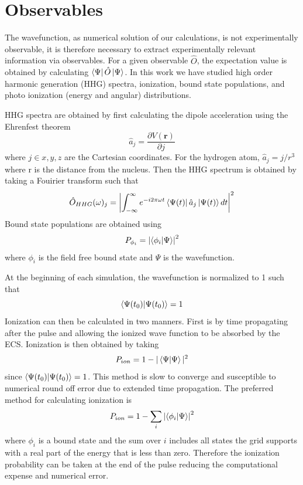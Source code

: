 \section{Observables} %
\label{sec:observables}

The wavefunction, as numerical solution of our calculations, is not experimentally observable, it is therefore necessary to extract experimentally relevant information via observables. For a given observable $\hat{O}$, the expectation value is obtained by calculating $\bra{\Psi}\hat{O}\ket{\Psi}$. In this work we have studied high order harmonic generation (HHG) spectra, ionization, bound state populations, and photo ionization (energy and angular) distributions.

HHG spectra are obtained by first calculating the dipole acceleration using the Ehrenfest theorem
\begin{equation}
  \hat{a}_j =  \frac{\partial V(\mathbf{r})}{\partial j}
\end{equation}
where $j \in x, y, z$ are the Cartesian coordinates. For the hydrogen atom, $\hat{a}_j=j/r^3$ where r is the distance from the nucleus. Then the HHG spectrum is obtained by taking a Fouirier transform such that
\begin{equation}
    \hat{O}_{HHG}(\omega)_j = \left| \int_{-\infty}^\infty e^{-i2\pi\omega t}\bra{\Psi(t)}\hat{a}_j\ket{\Psi(t)}dt\right|^2
\end{equation}
Bound state populations are obtained using 
\begin{equation}
  P_{\phi_i} = \left|\bra{\phi_i}\ket{\Psi}\right|^2
\end{equation}
where $\phi_i$ is the field free bound state and $\Psi$ is the wavefunction.

At the beginning of each simulation, the wavefunction is normalized to 1 such that
\begin{equation}
\bra{\Psi(t_0)}\ket{\Psi(t_0)} = 1
\end{equation}
Ionization can then be calculated in two manners. First is by time propagating after the pulse and allowing the ionized wave function to be absorbed by the ECS. Ionization is then obtained by taking 
\begin{equation}
  P_{ion}=1-|\bra{\Psi}\ket{\Psi}|^2
\end{equation}
since $\bra{\Psi(t_0)}\ket{\Psi(t_0)}=1$. This method is slow to converge and susceptible to numerical round off error due to extended time propagation. The preferred method for calculating ionization is 
\begin{equation}
  P_{ion}=1-\sum\limits_i\left|\bra{\phi_i}\ket{\Psi}\right|^2
\end{equation}
where $\phi_i$ is a bound state and the sum over $i$ includes all states the grid supports with a real part of the energy that is less than zero. Therefore the ionization probability can be taken at the end of the pulse reducing the computational expense and numerical error.



